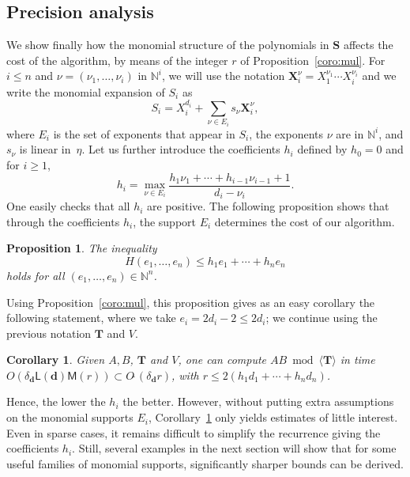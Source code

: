 \documentclass[amsthm]{elsart}
\def\d {\ensuremath{\mathbf{d}}}
\def\L {\ensuremath{\mathsf{L}}}
\def\N {\ensuremath{\mathbb{N}}}
\def\S {\ensuremath{\mathbf{S}}}
\def\X {\ensuremath{\mathbf{X}}}
\def\T {\ensuremath{\mathbf{T}}}
\def\M {\ensuremath{\mathsf{M}}}
\theoremstyle{plain}
\newtheorem{Corollary}{Corollary}
\newtheorem{Proposition}{Proposition}
\begin{document}
\subsection{Precision analysis}\label{ssec:prec}

We show finally how the monomial structure of the polynomials in $\S$
affects the cost of the algorithm, by means of the integer $r$ of
Proposition~\ref{coro:mul}. For $i \le n$ and
$\nu=(\nu_1,\dots,\nu_i)$ in $\N^i$, we will use the notation
$\X_i^\nu=X_1^{\nu_1} \cdots X_i^{\nu_i}$ and we write the monomial
expansion of $S_i$ as
\begin{equation}\label{eq:Si}
S_i = X_i^{d_i} + \sum_{\nu \in E_i} s_\nu \X_i^\nu,
\end{equation}
where $E_i$ is the set of exponents that appear in $S_i$, the
exponents $\nu$ are in $\N^i$, and $s_\nu$ is linear in~$\eta$.
Let us further introduce the coefficients $h_i$ defined by $h_0=0$ and
for $i \ge 1$,
\begin{equation}\label{eq:hi}
h_i = \max_{\nu \in E_i}  \frac{h_1 \nu_{1} + \cdots + h_{i-1} \nu_{i-1} + 1}{d_i-\nu_{i}}.
\end{equation}
One easily checks that all $h_i$ are positive. The following
proposition shows that through the coefficients $h_i$, the support
$E_i$ determines the cost of our algorithm.
\begin{Proposition}\label{prop:9}
 The inequality 
 $$H(e_1,\dots,e_n) \le h_1 e_1 + \cdots + h_n e_n$$
 holds for all $(e_1,\dots,e_n) \in \N^n$.
\end{Proposition}
Using Proposition~\ref{coro:mul}, this proposition gives as an easy
corollary the following statement, where we take $e_i = 2d_i -2 \le 2
d_i$; we continue using the previous notation $\T$ and $V$.
\begin{Corollary}\label{coro:r}
  Given $A, B$, $\T$ and $V$, one can compute $AB \bmod \langle \T
  \rangle$ in time $O(\delta_\d \L(\d)\M(r)) \subset
  O\tilde{~}(\delta_\d r)$, with $r \le 2( h_1 d_1 + \cdots + h_n d_n )$.
\end{Corollary}
Hence, the lower the $h_i$ the better. However, without putting extra
assumptions on the monomial supports $E_i$, Corollary~\ref{coro:r}
only yields estimates of little interest. Even in sparse cases, it
remains difficult to simplify the recurrence giving the coefficients
$h_i$. Still, several examples in the next section will show that for
some useful families of monomial supports, significantly sharper
bounds can be derived.
\end{document}
